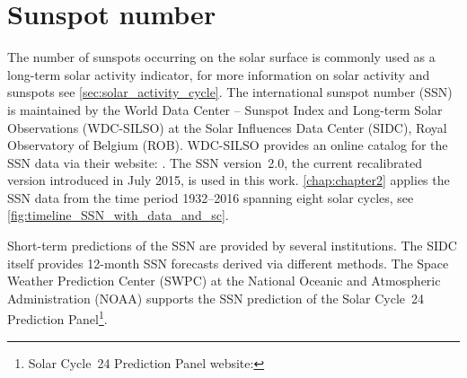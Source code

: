 \section{Sunspot number}
\label{sec:sunspot_number}
The number of sunspots occurring on the solar surface is commonly used as a long-term solar activity indicator, for more information on solar activity and sunspots see \autoref{sec:solar_activity_cycle}. The international sunspot number (SSN) is maintained by the World Data Center -- Sunspot Index and Long-term Solar Observations (WDC-SILSO) at the Solar Influences Data Center (SIDC), Royal Observatory of Belgium (ROB). WDC-SILSO provides an online catalog for the SSN data via their website: . The SSN version~2.0, the current recalibrated version introduced in July 2015, is used in this work. \autoref{chap:chapter2} applies the SSN data from the time period 1932--2016 spanning eight solar cycles, see \autoref{fig:timeline_SSN_with_data_and_sc}.

Short-term predictions of the SSN are provided by several institutions. The SIDC itself provides 12-month SSN forecasts derived via different methods. The Space Weather Prediction Center (SWPC) at the National Oceanic and Atmospheric Administration (NOAA) supports the SSN prediction of the Solar Cycle~24 Prediction Panel\footnote{Solar Cycle~24 Prediction Panel website: }.



